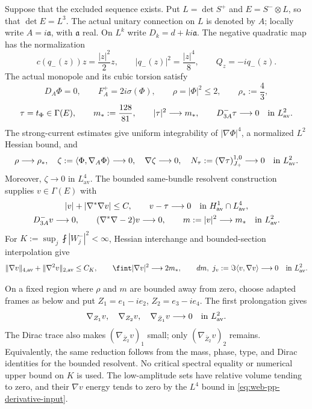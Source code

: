 Suppose that the excluded sequence exists.  Put
\(L=\det S^+\) and \(E=S^-\otimes L\), so that \(\det E=L^3\).
The actual unitary connection on \(L\) is denoted by \(A\); locally write
\(A=i\mathfrak a\), with \(\mathfrak a\) real.  On \(L^k\) write
\(D_k=d+ki\mathfrak a\).  The negative quadratic map has the normalization
\[
 c(q_-(z))z=\frac{|z|^2}{2}z,\qquad
 |q_-(z)|^2=\frac{|z|^4}{8},\qquad Q_z=-iq_-(z).
\]
The actual monopole and its cubic torsion satisfy
\[
 D_A\Phi=0,\qquad F_A^+=2i\sigma(\Phi),\qquad
 \rho=|\Phi|^2\le2,\qquad \rho_*:=\frac43,
\]
\[
 \tau=t_\Phi\in\Gamma(E),\qquad m_*:=\frac{128}{81},\qquad
 |\tau|^2\longrightarrow m_*,\qquad D^-_{3A}\tau\longrightarrow0
 \quad\hbox{in }L^2_{\mathrm{av}}.
\]
The strong-current estimates give uniform integrability of
\(|\nabla\Phi|^4\), a normalized \(L^2\) Hessian bound, and
\begin{equation}
 \rho\longrightarrow\rho_*,\quad
 \zeta:=\langle\Phi,\nabla_A\Phi\rangle\longrightarrow0,\quad
 \nabla\zeta\longrightarrow0,\quad
 N_\tau:=(\nabla\tau)^{1,0}_{J_+}\longrightarrow0
 \quad\hbox{in }L^2_{\mathrm{av}}.
 \label{eq:web-pp-strong-input}
\end{equation}
Moreover, \(\zeta\to0\) in \(L^4_{\mathrm{av}}\).  The bounded
same-bundle resolvent construction supplies \(v\in\Gamma(E)\) with
\begin{equation}
 \begin{gathered}
 |v|+|\nabla^*\nabla v|\le C,\qquad
 v-\tau\longrightarrow0\quad\hbox{in }H^1_{\mathrm{av}}\cap L^4_{\mathrm{av}},\\
 D^-_{3A}v\longrightarrow0,\qquad
 (\nabla^*\nabla-2)v\longrightarrow0,\qquad
 m:=|v|^2\longrightarrow m_*
 \quad\hbox{in }L^2_{\mathrm{av}}.
 \end{gathered}
 \label{eq:web-pp-resolvent-input}
\end{equation}
For \(K:=\sup_j\fint|W_j^-|^2<\infty\), Hessian interchange and
bounded-section interpolation give
\begin{equation}
 \|\nabla v\|_{4,\mathrm{av}}+\|\nabla^2v\|_{2,\mathrm{av}}\le C_K,
 \qquad \fint|\nabla v|^2\longrightarrow2m_*,\qquad
 dm,\ j_v:=\Im\langle v,\nabla v\rangle\longrightarrow0
 \quad\hbox{in }L^2_{\mathrm{av}}.
 \label{eq:web-pp-derivative-input}
\end{equation}

On a fixed region where \(\rho\) and \(m\) are bounded away from zero,
choose adapted frames as below and put
\(Z_1=e_1-ie_2\), \(Z_2=e_3-ie_4\).  The first prolongation gives
\begin{equation}
 \nabla_{Z_1}v,\quad\nabla_{Z_2}v,\quad
 \nabla_{\bar Z_1}v\longrightarrow0
 \quad\hbox{in }L^2_{\mathrm{av}}.
 \label{eq:web-pp-first-prolongation}
\end{equation}
The Dirac trace also makes \((\nabla_{\bar Z_2}v)_1\) small; only
\((\nabla_{\bar Z_2}v)_2\) remains.  Equivalently, the same reduction
follows from the mass, phase, type, and Dirac identities for the bounded
resolvent.  No critical spectral equality or numerical upper bound on \(K\)
is used.  The low-amplitude sets have relative volume tending to zero, and
their \(\nabla v\) energy tends to zero by the \(L^4\) bound in
\eqref{eq:web-pp-derivative-input}.


